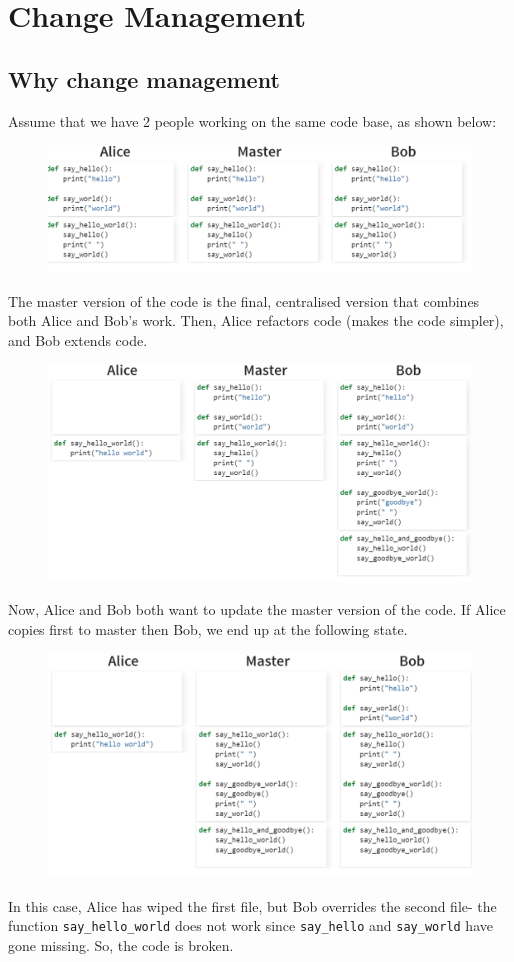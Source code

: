 \documentclass[a4paper, openany]{memoir}
\begin{document}
\chapter{Change Management}
\section{Why change management}
Assume that we have 2 people working on the same code base, as shown below:
\begin{figure}[H]
    \centering
    \includegraphics[scale=0.5]{src/3.1 Example1.PNG}
\end{figure}
\noindent The master version of the code is the final, centralised version that combines both Alice and Bob's work. Then, Alice refactors code (makes the code simpler), and Bob extends code.
\begin{figure}[H]
    \centering
    \includegraphics[scale=0.5]{src/3.2 Example2.PNG}
\end{figure}
Now, Alice and Bob both want to update the master version of the code. If Alice copies first to master then Bob, we end up at the following state.
\begin{figure}[H]
    \centering
    \includegraphics[scale=0.5]{src/3.3 Example3.PNG}
\end{figure}
\noindent In this case, Alice has wiped the first file, but Bob overrides the second file- the function \texttt{say\_hello\_world} does not work since \texttt{say\_hello} and \texttt{say\_world} have gone missing. So, the code is broken. 
\end{document}
